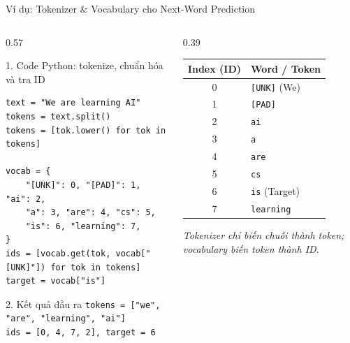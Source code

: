 \documentclass[aspectratio=169, 10pt]{beamer}
\begin{document}
\begin{frame}[fragile]{Ví dụ: Tokenizer \& Vocabulary cho Next-Word Prediction}
\begin{columns}[T]
\begin{column}{0.57\textwidth}
\begin{block}{1. Code Python: tokenize, chuẩn hóa và tra ID}
\begin{lstlisting}[style=rnnpython]
text = "We are learning AI"
tokens = text.split()
tokens = [tok.lower() for tok in tokens]

vocab = {
    "[UNK]": 0, "[PAD]": 1, "ai": 2,
    "a": 3, "are": 4, "cs": 5,
    "is": 6, "learning": 7,
}
ids = [vocab.get(tok, vocab["[UNK]"]) for tok in tokens]
target = vocab["is"]
\end{lstlisting}
\end{block}

\begin{exampleblock}{2. Kết quả đầu ra}
\scriptsize
\texttt{tokens = ["we", "are", "learning", "ai"]}\\
\texttt{ids = [0, 4, 7, 2], target = 6}
\end{exampleblock}
\end{column}

\begin{column}{0.39\textwidth}
\centering
\scriptsize
\begin{tabular}{c l}
\toprule
\textbf{Index (ID)} & \textbf{Word / Token} \\
\midrule
0 & \texttt{[UNK]} (We) \\
1 & \texttt{[PAD]} \\
2 & \texttt{ai} \\
3 & \texttt{a} \\
4 & \texttt{are} \\
5 & \texttt{cs} \\
\rowcolor{yellow!25}
6 & \texttt{is} (Target) \\
7 & \texttt{learning} \\
\bottomrule
\end{tabular}

\vspace{0.12cm}
\textit{Tokenizer chỉ biến chuỗi thành token; vocabulary biến token thành ID.}
\end{column}
\end{columns}
\end{frame}
\end{document}
